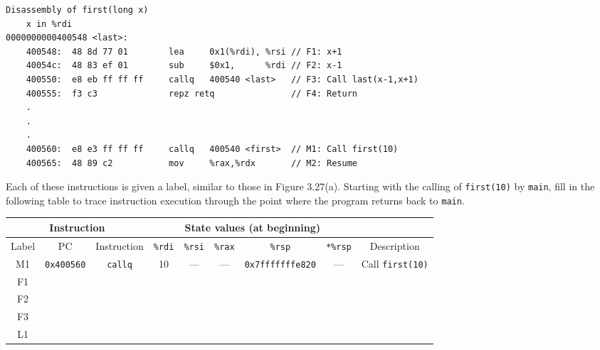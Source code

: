 \documentclass[12pt]{article}
\newenvironment{ex}[2][Exercise]{\begin{trivlist}
		\item[\hskip \labelsep {\bfseries #1}\hskip \labelsep {\bfseries #2.}]}{\end{trivlist}}
\begin{document}
{\begin{ex}{3.32}
\begin{lstlisting}[language={}]
	Disassembly of first(long x)
	x in %rdi
0000000000400548 <last>:
	400548:  48 8d 77 01		lea		0x1(%rdi), %rsi	// F1: x+1
	40054c:  48 83 ef 01		sub		$0x1,      %rdi	// F2: x-1
	400550:  e8 eb ff ff ff		callq   400540 <last>   // F3: Call last(x-1,x+1)
	400555:  f3 c3				repz retq				// F4: Return
	.
	.
	.
	400560:  e8 e3 ff ff ff		callq	400540 <first>	// M1: Call first(10)
	400565:	 48 89 c2			mov		%rax,%rdx		// M2: Resume
	\end{lstlisting}
	Each of these instructions is given a label, similar to those in Figure 3.27(a).
	Starting with the calling of \texttt{first(10)} by \texttt{main}, fill in the following
	table to trace instruction execution through the point where the program returns back
	to \texttt{main}.
	\begin{center}
		\begin{tabular}{ccccccccc}
			\multicolumn{3}{c}{Instruction} & \multicolumn{5}{c}{State values (at beginning)} & {}\\
			\hline
			Label & PC & Instruction & \texttt{\%rdi} & \texttt{\%rsi} & \texttt{\%rax} &
			\texttt{\%rsp} & \texttt{*\%rsp} & Description\\
			\hline
			M1 & \texttt{0x400560} & \texttt{callq} & 10 & --- & --- &  \texttt{0x7fffffffe820} & --- & Call \texttt{first(10)}\\
			
			F1 & \makebox[1cm]{\hrulefill} & \makebox[1cm]{\hrulefill} & \makebox[1cm]{\hrulefill}
			& \makebox[1cm]{\hrulefill} & \makebox[1cm]{\hrulefill} & \makebox[1cm]{\hrulefill}
			& \makebox[1cm]{\hrulefill} & \makebox[1cm]{\hrulefill} \\
			
			F2 & \makebox[1cm]{\hrulefill} & \makebox[1cm]{\hrulefill} & \makebox[1cm]{\hrulefill}
			& \makebox[1cm]{\hrulefill} & \makebox[1cm]{\hrulefill} & \makebox[1cm]{\hrulefill}
			& \makebox[1cm]{\hrulefill} & \makebox[1cm]{\hrulefill} \\
			
			F3 & \makebox[1cm]{\hrulefill} & \makebox[1cm]{\hrulefill} & \makebox[1cm]{\hrulefill}
			& \makebox[1cm]{\hrulefill} & \makebox[1cm]{\hrulefill} & \makebox[1cm]{\hrulefill}
			& \makebox[1cm]{\hrulefill} & \makebox[1cm]{\hrulefill}\\

			L1 & \makebox[1cm]{\hrulefill} & \makebox[1cm]{\hrulefill} & \makebox[1cm]{\hrulefill}
			& \makebox[1cm]{\hrulefill} & \makebox[1cm]{\hrulefill} & \makebox[1cm]{\hrulefill}
			& \makebox[1cm]{\hrulefill} & \makebox[1cm]{\hrulefill} \\
			

\end{tabular}
\end{center}
\end{ex}}
\end{document}
